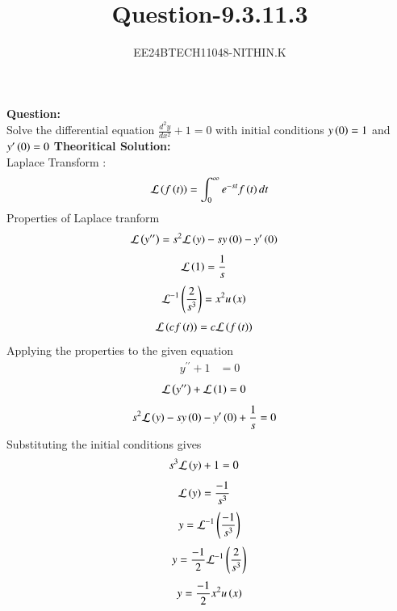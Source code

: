 \documentclass[journal]{IEEEtran}
\numberwithin{equation}{enumi}
\numberwithin{figure}{enumi}
\begin{document}


\title{Question-9.3.11.3}
\author{EE24BTECH11048-NITHIN.K} 
{\let\newpage\relax\maketitle}
\textbf{Question:} \\
Solve the differential equation $\frac{d^2y}{dx^2} + 1 = 0$ with initial conditions $y\left(0\right) = 1$ and $y^{\prime}\left(0\right) = 0$
\textbf{Theoritical Solution:} \\
Laplace Transform :\\
\begin{align}
	\mathcal{L}\left(f\left(t\right)\right) = \int_{0}^{\infty}e^{-st}f\left(t\right)dt
\end{align}
Properties of Laplace tranform
\begin{align}
	\mathcal{L}\left(y^{\prime\prime}\right) &= s^2\mathcal{L}\left(y\right) -sy\left(0\right)-y^\prime\left(0\right)
\end{align}
\begin{align}
	\mathcal{L}\left(1\right) &= \frac{1}{s}
\end{align}
\begin{align}
	\mathcal{L}^{-1}\left(\frac{2}{s^3}\right) &= x^2u\left(x\right)
\end{align}
\begin{align}
	\mathcal{L}\left(cf\left(t\right)\right) &= c\mathcal{L}\left(f\left(t\right)\right)
\end{align}
Applying the properties to the given equation
\begin{align}
	y^{\prime\prime} + 1 &= 0
\end{align}
\begin{align}
	\mathcal{L}\left(y^{\prime\prime}\right) + \mathcal{L}\left(1\right) &= 0
\end{align}
\begin{align}
	s^2\mathcal{L}\left(y\right) -sy\left(0\right)-y^\prime\left(0\right)+\frac{1}{s} &= 0
\end{align}
Substituting the initial conditions gives
\begin{align}
	s^3\mathcal{L}\left(y\right) + 1 &= 0
\end{align}
\begin{align}
	\mathcal{L}\left(y\right) &= \frac{-1}{s^3}
\end{align}
\begin{align}
	y = \mathcal{L}^{-1}\left(\frac{-1}{s^3}\right)
\end{align}
\begin{align}
	y = \frac{-1}{2}\mathcal{L}^{-1}\left(\frac{2}{s^3}\right)
\end{align}
\begin{align}
	y = \frac{-1}{2}x^2u\left(x\right)
\end{align}
\end{document}
